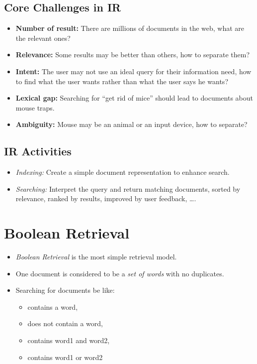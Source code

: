 		\subsection{Core Challenges in IR} %
			\begin{itemize}
				\item \textbf{Number of result:} There are millions of documents in the web, what are the relevant ones?
				\item \textbf{Relevance:} Some results may be better than others, how to separate them?
				\item \textbf{Intent:} The user may not use an ideal query for their information need, how to find what the user wants rather than what the user says he wants?
				\item \textbf{Lexical gap:} Searching for \enquote{get rid of mice} should lead to documents about mouse traps.
				\item \textbf{Ambiguity:} Mouse may be an animal or an input device, how to separate?
			\end{itemize}

		\subsection{IR Activities} %
			\begin{itemize}
				\item \textit{Indexing:} Create a simple document representation to enhance search.
				\item \textit{Searching:} Interpret the query and return matching documents, sorted by relevance, ranked by results, improved by user feedback, \dots.
			\end{itemize}

	\section{Boolean Retrieval} %
		\begin{itemize}
			\item \textit{Boolean Retrieval} is the most simple retrieval model.
			\item One document is considered to be a \textit{set of words} with no duplicates.
			\item Searching for documents be like:
				\begin{itemize}
					\item contains a word,
					\item does not contain a word,
					\item contains word1 and word2,
					\item contains word1 or word2
				\end{itemize}
		\end{itemize}

